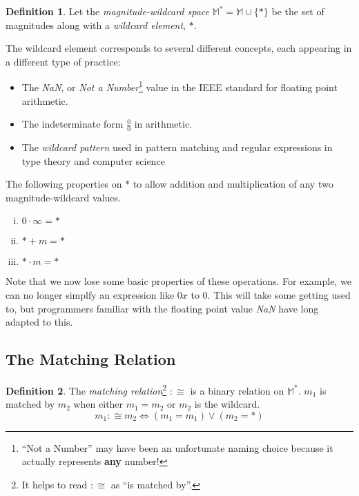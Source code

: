 \documentclass[twoside]{article}
\newcommand{\quotes}[1]{``#1''}
\theoremstyle{plain}%
\theoremstyle{definition}
\newtheorem{definition}{Definition}[section]
\theoremstyle{remark}
\begin{document}
\begin{definition}
Let the \textit{magnitude-wildcard space} \(\mathbb{M}^*= \mathbb{M} \cup \{\ast\}\) be the set of magnitudes along with a \textit{wildcard element}, \(\ast\).
\end{definition}

The wildcard element corresponds to several different concepts, each appearing in a different type of practice:
\begin{itemize}
  \item The \textit{NaN}, or \textit{Not a Number}\footnote{\quotes{Not a Number} may have been an unfortunate naming choice because it actually represents \textbf{any} number!} value in the IEEE standard for floating point arithmetic\cite{ieee}.
  \item The indeterminate form \(\frac{0}{0}\) in arithmetic.
  \item The \textit{wildcard pattern} used in pattern matching and regular expressions in type theory and computer science
\end{itemize}

The following properties on \(\ast\) to allow addition and multiplication of any two magnitude-wildcard values.
\begin{enumerate}[(i)]
  \item \(0 \cdot \infty = \ast\)
  \item \(\ast + m = \ast\)
  \item \(\ast \cdot m = \ast\)
\end{enumerate}

Note that we now lose some basic properties of these operations. For example, we can no longer simplfy an expression like \(0x\) to \(0\). This will take some getting used to, but programmers familiar with the floating point value \textit{NaN} have long adapted to this.

\subsection{The Matching Relation}

\begin{definition}
The \textit{matching relation}\footnote{It helps to read \(:\cong\) as \quotes{is matched by}.} \(:\cong\) is a binary relation on \(\mathbb{M}^*\). \(m_1\) is matched by \(m_2\) when either \(m_1 = m_2\) or  \(m_2\) is the wildcard.
\[m_1 :\cong m_2 \Longleftrightarrow (m_1 = m_1) \vee (m_2 = \ast)\]
\end{definition}
\end{document}
